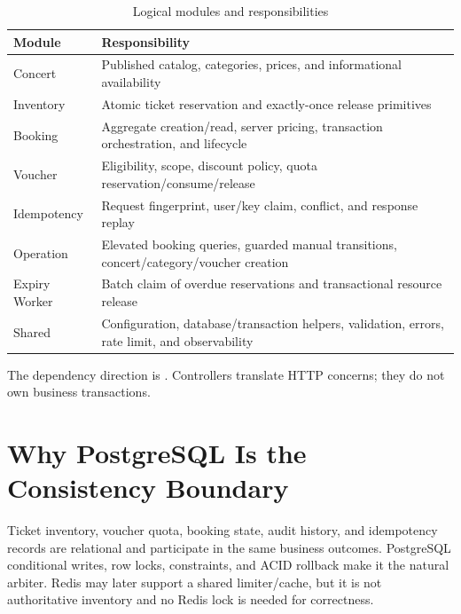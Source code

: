 \begin{table}[H]
\centering
\caption{Logical modules and responsibilities}
\begin{tabularx}{\textwidth}{p{}Y}
\toprule
\textbf{Module} & \textbf{Responsibility} \\
\midrule
Concert & Published catalog, categories, prices, and informational availability \\
Inventory & Atomic ticket reservation and exactly-once release primitives \\
Booking & Aggregate creation/read, server pricing, transaction orchestration, and lifecycle \\
Voucher & Eligibility, scope, discount policy, quota reservation/consume/release \\
Idempotency & Request fingerprint, user/key claim, conflict, and response replay \\
Operation & Elevated booking queries, guarded manual transitions, concert/category/voucher creation \\
Expiry Worker & Batch claim of overdue reservations and transactional resource release \\
Shared & Configuration, database/transaction helpers, validation, errors, rate limit, and observability \\
\bottomrule
\end{tabularx}
\end{table}

The dependency direction is . Controllers translate HTTP concerns;
they do not own business transactions.

\section{Why PostgreSQL Is the Consistency Boundary}
Ticket inventory, voucher quota, booking state, audit history, and idempotency
records are relational and participate in the same business outcomes.
PostgreSQL conditional writes, row locks, constraints, and ACID rollback make it
the natural arbiter. Redis may later support a shared limiter/cache, but it is
not authoritative inventory and no Redis lock is needed for correctness.

